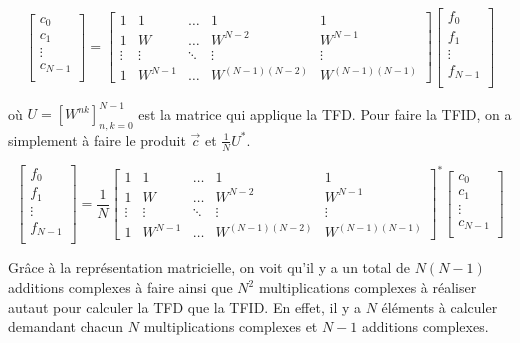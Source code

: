\begin{equation*} 
    \begin{bmatrix}
        c_0 \\
        c_1 \\
        \vdots \\
        c_{N-1} \\
    \end{bmatrix}
    =
    \begin{bmatrix}
        1 & 1 & \dots & 1 & 1\\
        1 & W & \dots & W^{N-2} & W^{N-1}\\
        \vdots & \vdots & \ddots & \vdots & \vdots\\
        1 & W^{N-1} & \dots & W^{(N-1)(N-2)} & W^{(N-1)(N-1)}
    \end{bmatrix}
    \begin{bmatrix}
        f_0 \\
        f_1 \\
        \vdots \\
        f_{N-1} \\
    \end{bmatrix}
\end{equation*}

où $U = \left[W^{nk}\right]_{n,k=0}^{N-1}$ est la matrice qui applique la TFD. Pour faire la TFID, on a simplement à faire le produit $\vec{c}$ et $\frac{1}{N}U^*$.

\begin{equation*} 
    \begin{bmatrix}
        f_0 \\
        f_1 \\
        \vdots \\
        f_{N-1} \\
    \end{bmatrix}
    = \frac{1}{N}
    \begin{bmatrix}
        1 & 1 & \dots & 1 & 1\\
        1 & W & \dots & W^{N-2} & W^{N-1}\\
        \vdots & \vdots & \ddots & \vdots & \vdots\\
        1 & W^{N-1} & \dots & W^{(N-1)(N-2)} & W^{(N-1)(N-1)}
    \end{bmatrix}^*
    \begin{bmatrix}
        c_0 \\
        c_1 \\
        \vdots \\
        c_{N-1} \\
    \end{bmatrix}
\end{equation*}

Grâce à la représentation matricielle, on voit qu'il y a un total de $N (N-1)$ additions complexes à faire ainsi que $N^2$ multiplications complexes à réaliser autaut pour calculer la TFD que la TFID. En effet, il y a $N$ éléments à calculer demandant chacun $N$ multiplications complexes et $N-1$ additions complexes. 
